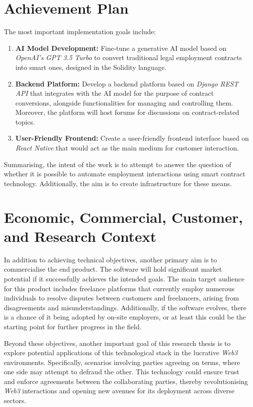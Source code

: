 \section{Achievement Plan}

The most important implementation goals include:

\begin{enumerate}
    \item \textbf{AI Model Development:} Fine-tune a generative AI model based on \textit{OpenAI's GPT 3.5 Turbo} to convert traditional legal employment contracts into smart ones, designed in the Solidity language.
    \item \textbf{Backend Platform:} Develop a backend platform based on \textit{Django REST API} that integrates with the AI model for the purpose of contract conversions, alongside functionalities for managing and controlling them. Moreover, the platform will host forums for discussions on contract-related topics.
    \item \textbf{User-Friendly Frontend:} Create a user-friendly frontend interface based on \textit{React Native} that would act as the main medium for customer interaction.
\end{enumerate} 

Summarising, the intent of the work is to attempt to answer the question of whether it is possible to automate employment interactions using smart contract technology. Additionally, the aim is to create infrastructure for these means. 

\section{Economic, Commercial, Customer, and Research Context}

In addition to achieving technical objectives, another primary aim is to commercialise the end product. The software will hold significant market potential if it successfully achieves the intended goals. The main target audience for this product includes freelance platforms that currently employ numerous individuals to resolve disputes between customers and freelancers, arising from disagreements and misunderstandings. Additionally, if the software evolves, there is a chance of it being adopted by on-site employers, or at least this could be the starting point for further progress in the field.

Beyond these objectives, another important goal of this research thesis is to explore potential applications of this technological stack in the lucrative \textit{Web3} environments. Specifically, scenarios involving parties agreeing on terms, where one side may attempt to defraud the other. This technology could ensure trust and enforce agreements between the collaborating parties, thereby revolutionising \textit{Web3} interactions and opening new avenues for its deployment across diverse sectors.

